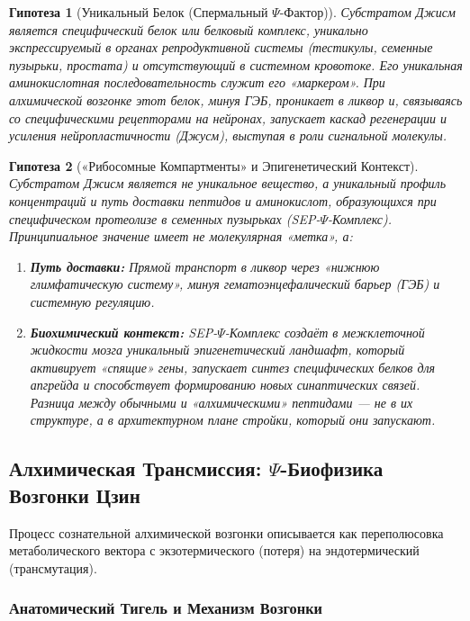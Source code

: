 \documentclass[a4paper,12pt]{article}
\newtheorem{hypothesis}{Гипотеза}
\begin{document}
\begin{hypothesis}[Уникальный Белок (Спермальный $\Psi$-Фактор)]
	Субстратом Джисм является специфический белок или белковый комплекс, уникально экспрессируемый в органах репродуктивной системы (тестикулы, семенные пузырьки, простата) и отсутствующий в системном кровотоке. Его уникальная аминокислотная последовательность служит его «маркером». При алхимической возгонке этот белок, минуя ГЭБ, проникает в ликвор и, связываясь со специфическими рецепторами на нейронах, запускает каскад регенерации и усиления нейропластичности (Джусм), выступая в роли сигнальной молекулы.
\end{hypothesis}

\begin{hypothesis}[«Рибосомные Компартменты» и Эпигенетический Контекст]
	Субстратом Джисм является не уникальное вещество, а уникальный профиль концентраций и путь доставки пептидов и аминокислот, образующихся при специфическом протеолизе в семенных пузырьках (SEP-$\Psi$-Комплекс). Принципиальное значение имеет не молекулярная «метка», а:
	
	\begin{enumerate}
		\item \textbf{Путь доставки:} Прямой транспорт в ликвор через «нижнюю глимфатическую систему», минуя гематоэнцефалический барьер (ГЭБ) и системную регуляцию.
		\item \textbf{Биохимический контекст:} SEP-$\Psi$-Комплекс создаёт в межклеточной жидкости мозга уникальный эпигенетический ландшафт, который активирует «спящие» гены, запускает синтез специфических белков для апгрейда и способствует формированию новых синаптических связей. Разница между обычными и «алхимическими» пептидами — не в их структуре, а в архитектурном плане стройки, который они запускают.
	\end{enumerate}
\end{hypothesis}

\subsection{Алхимическая Трансмиссия: $\Psi$-Биофизика Возгонки Цзин}

Процесс сознательной алхимической возгонки описывается как переполюсовка метаболического вектора с экзотермического (потеря) на эндотермический (трансмутация).

\subsubsection{Анатомический Тигель и Механизм Возгонки}
\end{document}

